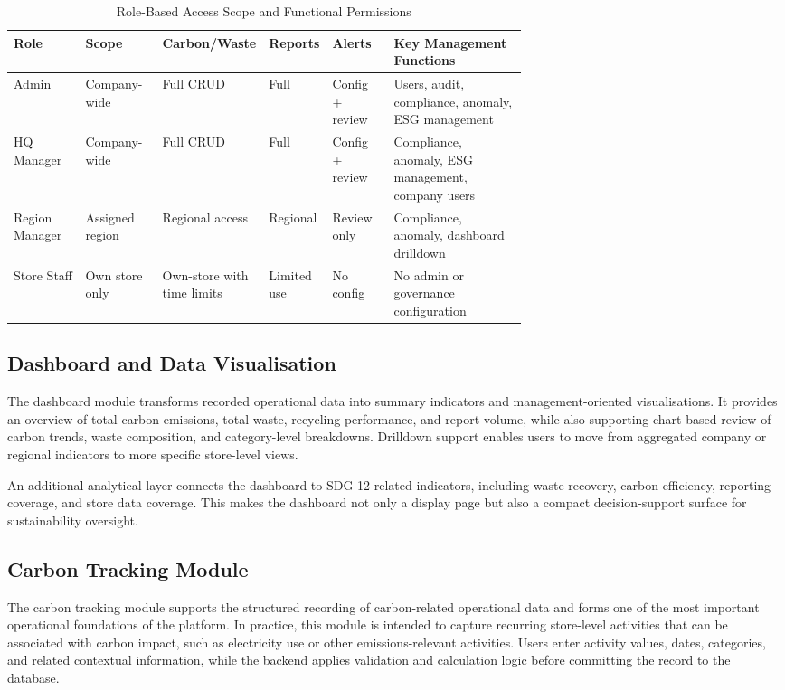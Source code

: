\documentclass[11pt,a4paper]{article}
\begin{document}
\begin{table}[h]
\centering
\scriptsize
\begin{tabularx}{\linewidth}{@{}p{0.14\linewidth}p{0.15\linewidth}p{0.14\linewidth}p{0.11\linewidth}p{0.12\linewidth}X@{}}
\toprule
\textbf{Role} & \textbf{Scope} & \textbf{Carbon/Waste} & \textbf{Reports} & \textbf{Alerts} & \textbf{Key Management Functions} \\
\midrule
Admin & Company-wide & Full CRUD & Full & Config + review & Users, audit, compliance, anomaly, ESG management \\
HQ Manager & Company-wide & Full CRUD & Full & Config + review & Compliance, anomaly, ESG management, company users \\
Region Manager & Assigned region & Regional access & Regional & Review only & Compliance, anomaly, dashboard drilldown \\
Store Staff & Own store only & Own-store with time limits & Limited use & No config & No admin or governance configuration \\
\bottomrule
\end{tabularx}
\caption{Role-Based Access Scope and Functional Permissions}
\end{table}

\subsection{Dashboard and Data Visualisation}
The dashboard module transforms recorded operational data into summary indicators and management-oriented visualisations. It provides an overview of total carbon emissions, total waste, recycling performance, and report volume, while also supporting chart-based review of carbon trends, waste composition, and category-level breakdowns. Drilldown support enables users to move from aggregated company or regional indicators to more specific store-level views.

An additional analytical layer connects the dashboard to SDG 12 related indicators, including waste recovery, carbon efficiency, reporting coverage, and store data coverage. This makes the dashboard not only a display page but also a compact decision-support surface for sustainability oversight.

\subsection{Carbon Tracking Module}
The carbon tracking module supports the structured recording of carbon-related operational data and forms one of the most important operational foundations of the platform. In practice, this module is intended to capture recurring store-level activities that can be associated with carbon impact, such as electricity use or other emissions-relevant activities. Users enter activity values, dates, categories, and related contextual information, while the backend applies validation and calculation logic before committing the record to the database.
\end{document}
